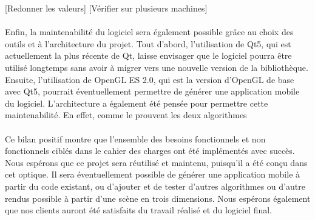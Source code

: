 [Redonner les valeurs]
[Vérifier sur plusieurs machines]

\paragraph{}
Enfin, la maintenabilité du logiciel sera également possible grâce au choix des outils et à l'architecture du projet. 
Tout d'abord, l'utilisation de Qt5, qui est actuellement la plus récente de Qt, laisse envisager que le logiciel pourra être utilisé longtemps sans avoir à migrer vers une nouvelle version de la bibliothèque. Ensuite, l'utilisation de OpenGL ES 2.0, qui est la version d'OpenGL de base avec Qt5, pourrait éventuellement permettre de générer une application mobile du logiciel. 
L'architecture a également été pensée pour permettre cette maintenabilité. En effet, comme le prouvent les deux algorithmes 


\paragraph{}
Ce bilan positif montre que l'ensemble des besoins fonctionnels et non fonctionnels ciblés dans le cahier des charges ont été implémentés avec succès. Nous espérons que ce projet sera réutilisé et maintenu, puisqu'il a été conçu dans cet optique. Il sera éventuellement possible de générer une application mobile à partir du code existant, ou d'ajouter et de tester d'autres algorithmes ou d'autre rendus possible à partir d'une scène en trois dimensions. Nous espérons également que nos clients auront été satisfaits du travail réalisé et du logiciel final. 
